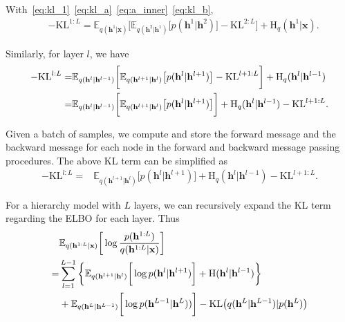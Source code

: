 \documentclass{article} %
\begin{document}
With~\eqref{eq:kl_1}~\eqref{eq:kl_a}~\eqref{eq:a_inner}~\eqref{eq:kl_b}, 
\begin{align*}
&-\text{KL}^{1:L} =    \mathbb{E}_{q(\mathbf{h}^{1}|\mathbf{x})} \bigg[  \mathbb{E}_{q(\mathbf{h}^{2}|\mathbf{h}^1)} \big[  p( \mathbf{h}^{1}|  \mathbf{h}^{2})    \big]  - \text{KL}^{2:L}  \bigg] +  \text{H}_q(\mathbf{h}^{1}|\mathbf{x}).
\end{align*}

Similarly, for layer $l$, we  have 
\begin{align*} %
-\text{KL}^{l:L} 
=  & \mathbb{E}_{q(\mathbf{h}^{l}|\mathbf{h}^{l-1})} \bigg[  \mathbb{E}_{q(\mathbf{h}^{l+1}|\mathbf{h}^l)} \big[  p( \mathbf{h}^{l}|  \mathbf{h}^{l+1})    \big]  - \text{KL}^{l+1:L}  \bigg]   +  \text{H}_q(\mathbf{h}^{l}|\mathbf{h}^{l-1}) \\ \notag
=&    \mathbb{E}_{q(\mathbf{h}^{l}|\mathbf{h}^{l-1})} \bigg[  \mathbb{E}_{q(\mathbf{h}^{l+1}|\mathbf{h}^l)} \big[  p( \mathbf{h}^{l}|  \mathbf{h}^{l+1})    \big]   \bigg] +  \text{H}_q(\mathbf{h}^{l}|\mathbf{h}^{l-1})  - \text{KL}^{l+1:L}.
\end{align*}

Given a batch of samples, we compute  and store the forward message and the backward message for each node in the forward and backward message passing procedures.  The above KL term can be simplified as
\begin{align} \label{eq:KL_tree}
-\text{KL}^{l:L} 
=&     \mathbb{E}_{q(\mathbf{h}^{l+1}|\mathbf{h}^l)} \big[  p( \mathbf{h}^{l}|  \mathbf{h}^{l+1})    \big]  +  \text{H}_q(\mathbf{h}^{l}|\mathbf{h}^{l-1})   - \text{KL}^{l+1:L}.
\end{align}



For a hierarchy model with $L$ layers, we can recursively expand the KL term regarding the ELBO for each layer.  Thus 
\begin{align} \label{eq:KL_all}
& \mathbb{E}_{q(\mathbf{h}^{1:L} | \mathbf{x})} \bigg[ \log  \frac{p( \mathbf{h}^{1:L})}{q(\mathbf{h}^{1:L}|\mathbf{x})}  \bigg] \\ \notag
=& \sum_{l=1}^{L-1} \bigg\{   \mathbb{E}_{q(\mathbf{h}^{l+1}|\mathbf{h}^l)} \bigg[ \log p( \mathbf{h}^{l}|  \mathbf{h}^{l+1})   \bigg]  +    \text{H}(\mathbf{h}^l | \mathbf{h}^{l-1} )  \bigg\} \\ \notag
&+  \mathbb{E}_{q(\mathbf{h}^L|\mathbf{h}^{L-1})} \bigg[ \log p( \mathbf{h}^{L-1}|  \mathbf{h}^L) )  \bigg]    -   \text{KL}\big(q(\mathbf{h}^L | \mathbf{h}^{L-1} )   | p(\mathbf{h}^L)  \big)
 \end{align}
\end{document}
